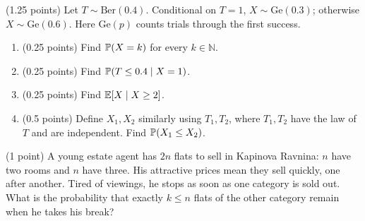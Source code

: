 \documentclass[a4paper]{report}
\begin{document}
\begin{problem} (1.25 points)
Let $T\sim\mathrm{Ber}(0.4)$. Conditional on $T=1$, $X\sim\mathrm{Ge}(0.3)$; otherwise $X\sim\mathrm{Ge}(0.6)$. Here $\mathrm{Ge}(p)$ counts trials through the first success.
\begin{enumerate}
\item (0.25 points) Find $\P(X=k)$ for every $k\in\mathbb N$.
\item (0.25 points) Find $\P(T\leq0.4\mid X=1)$.
\item (0.25 points) Find $\E[X\mid X\geq2]$.
\item (0.5 points) Define $X_1,X_2$ similarly using $T_1,T_2$, where $T_1,T_2$ have the law of $T$ and are independent. Find $\P(X_1\leq X_2)$.
\end{enumerate}
\end{problem}
\begin{problem} (1 point)
A young estate agent has $2n$ flats to sell in Kapinova Ravnina: $n$ have two rooms and $n$ have three. His attractive prices mean they sell quickly, one after another. Tired of viewings, he stops as soon as one category is sold out. What is the probability that exactly $k\leq n$ flats of the other category remain when he takes his break?
\end{problem}
\end{document}
